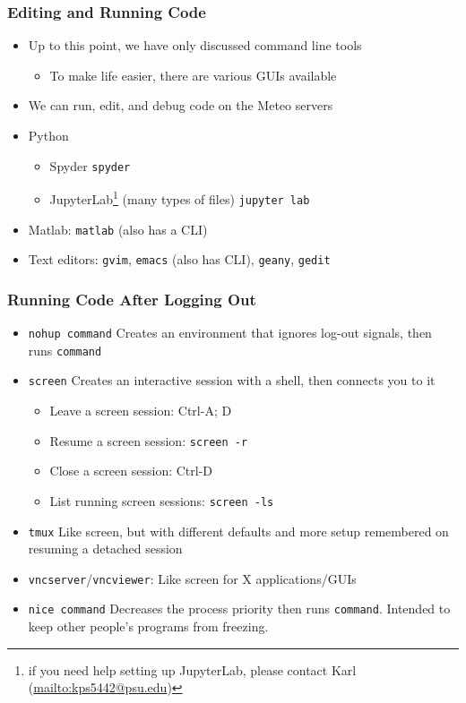 \documentclass[hyperref,pdfa,unicode,utf8,usepdftitle]{beamer}
\begin{document}
\begin{frame}
  \frametitle{Editing and Running Code}
  \begin{itemize}
  \item Up to this point, we have only discussed command line tools
    \begin{itemize}
    \item To make life easier, there are various GUIs available
    \end{itemize}
  \item We can run, edit, and debug code on the Meteo servers
  \item Python
    \begin{itemize}
    \item Spyder \lstinline{spyder}
    \item JupyterLab\footnote{if you need help setting up JupyterLab,
        please contact Karl (\url{mailto:kps5442@psu.edu})} (many types of
      files) \lstinline{jupyter lab}
    \end{itemize}
  \item Matlab: \lstinline{matlab} (also has a CLI)
  \item Text editors: \lstinline{gvim}, \lstinline{emacs} (also has
    CLI), \lstinline{geany}, \lstinline{gedit}
  \end{itemize}
\end{frame}

\begin{frame}
  \frametitle{Running Code After Logging Out}
  \begin{itemize}
  \item \lstinline{nohup command} Creates an environment that ignores
    log-out signals, then runs \lstinline{command}
  \item \lstinline{screen} Creates an interactive session with a
    shell, then connects you to it
    \begin{itemize}
    \item Leave a screen session: Ctrl-A; D
    \item Resume a screen session: \lstinline{screen -r}
    \item Close a screen session: Ctrl-D
    \item List running screen sessions: \lstinline{screen -ls}
    \end{itemize}
  \item \lstinline{tmux} Like screen, but with different defaults and
    more setup remembered on resuming a detached session
  \item \lstinline{vncserver}/\lstinline{vncviewer}: Like screen for X
    applications/GUIs
  \item \lstinline{nice command} Decreases the process priority then
    runs \lstinline{command}.  Intended to keep other people's
    programs from freezing.
  \end{itemize}
\end{frame}
\end{document}
